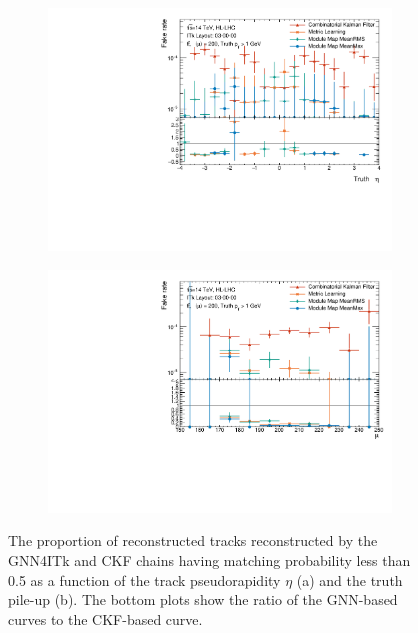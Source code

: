 \begin{figure}[h!]
\centering
\begin{subfigure}[b]{0.6\textwidth}
    \centering
    \includegraphics[width=\textwidth]{figures/ckf-gnn/FakeRate/fakerate_vs_eta.pdf}
    \caption{}
    \label{subfig:tracking-fake-eta}
\end{subfigure}
\begin{subfigure}[b]{0.6\textwidth}
    \centering
    \includegraphics[width=\textwidth]{figures/ckf-gnn/FakeRate/fakerate_vs_mu.pdf}
    \caption{}
    \label{subfig:tracking-fake-mu}
\end{subfigure}
    \caption{The proportion of reconstructed tracks reconstructed by the GNN4ITk and CKF chains having matching probability less than 0.5 as a function of the track pseudorapidity $\eta$ (a) and the truth pile-up (b). The bottom plots show the ratio of the GNN-based curves to the CKF-based curve.}
    \label{fig:tracking-fake-eta-mu}
\end{figure}

